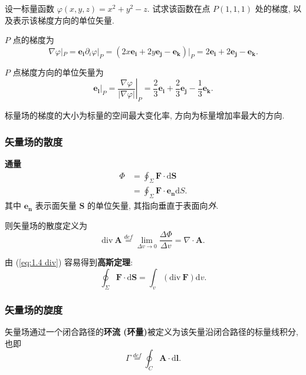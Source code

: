 \begin{exampleprob}[求梯度和单位矢量]
    设一标量函数 $\varphi(x,y,z)=x^2+y^2-z$. 试求该函数在点 $P(1,1,1)$ 处的梯度, 以及表示该梯度方向的单位矢量.

    \begin{solution}
        $P$ 点的梯度为
        \begin{equation*}
            \nabla\varphi|_P=\bm{e_i}\partial_i\varphi|_P=(2x\bm{e_i}+2y\bm{e_j}-\bm{e_k})|_P=2\bm{e_i}+2\bm{e_j}-\bm{e_k}.
        \end{equation*}

        $P$ 点梯度方向的单位矢量为
        \begin{equation*}
            \bm{e_l}|_P=\left.\frac{\nabla\varphi}{|\nabla\varphi|}\right|_P=\frac{2}{3}\bm{e_i}+\frac{2}{3}\bm{e_j}-\frac{1}{3}\bm{e_k}.
        \end{equation*}
    \end{solution}
\end{exampleprob}

标量场的梯度的大小为标量的空间最大变化率, 方向为标量增加率最大的方向.

\subsubsection{矢量场的散度}
\textbf{通量}
\begin{equation}
    \begin{aligned}
        \Phi & =\oint_{\Sigma}\bm{F}\cdot\mathrm{d}\bm{S}     \\
             & =\oint_{\Sigma}\bm{F}\cdot\bm{e_n}\mathrm{d}S.
    \end{aligned}
\end{equation}
其中 $\bm{e_n}$ 表示面矢量 $\bm{S}$ 的单位矢量, 其指向垂直于表面向\textit{外}.

则矢量场的散度定义为
\begin{equation} \label{eq:1.4 div}
    \mathrm{div}\ \bm{A}\stackrel{def}{=}\lim_{\Delta v\rightarrow 0}\frac{\Delta\Phi}{\Delta v}=\nabla\cdot\bm{A}.
\end{equation}

由 (\ref{eq:1.4 div}) 容易得到\textbf{高斯定理}:
\begin{equation} \label{eq:1.4 gauss}
    \oint_\Sigma\bm{F}\cdot\mathrm{d}\bm{S}=\int_{v}(\mathrm{div}\ \bm{F})\mathrm{d}v.
\end{equation}

\subsubsection{矢量场的旋度}
矢量场通过一个闭合路径的\textbf{环流 (环量)}被定义为该矢量沿闭合路径的标量线积分, 也即
\begin{equation}
    \Gamma\stackrel{def}{=}\oint_C\bm{A}\cdot\mathrm{d}\bm{l}.
\end{equation}

